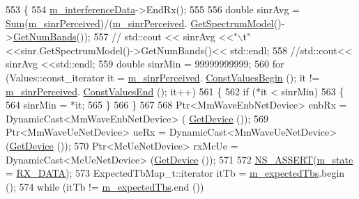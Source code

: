\begin{DoxyCode}
553 \{
554         \hyperlink{classns3_1_1MmWaveSpectrumPhy_a6fa712af38b75eaf093ca7feaaaa70fe}{m\_interferenceData}->EndRx();
555 
556         \textcolor{keywordtype}{double} sinrAvg = \hyperlink{namespacens3_afad5475661952172fe6ef1260360dad8}{Sum}(\hyperlink{classns3_1_1MmWaveSpectrumPhy_a61da15a483343ea141a555b3712db8d7}{m\_sinrPerceived})/(\hyperlink{classns3_1_1MmWaveSpectrumPhy_a61da15a483343ea141a555b3712db8d7}{m\_sinrPerceived}.
      \hyperlink{classns3_1_1SpectrumValue_ade13d535ac74958581d5ad059380dc2a}{GetSpectrumModel}()->\hyperlink{classns3_1_1SpectrumModel_a07c4a1c2f963885dd7fef7f82b20e90b}{GetNumBands}());
557 \textcolor{comment}{//      std::cout << sinrAvg <<"\(\backslash\)t" <<sinr.GetSpectrumModel()->GetNumBands()<< std::endl;}
558         \textcolor{comment}{//std::cout<< sinrAvg <<std::endl;}
559         \textcolor{keywordtype}{double} sinrMin = 99999999999;
560         \textcolor{keywordflow}{for} (Values::const\_iterator it = \hyperlink{classns3_1_1MmWaveSpectrumPhy_a61da15a483343ea141a555b3712db8d7}{m\_sinrPerceived}.
      \hyperlink{classns3_1_1SpectrumValue_aad6900431bd0554b3ba9a00691c2393b}{ConstValuesBegin} (); it != \hyperlink{classns3_1_1MmWaveSpectrumPhy_a61da15a483343ea141a555b3712db8d7}{m\_sinrPerceived}.
      \hyperlink{classns3_1_1SpectrumValue_ab5c2fbde4e06be7c0e4d7a0755c607be}{ConstValuesEnd} (); it++)
561         \{
562                 \textcolor{keywordflow}{if} (*it < sinrMin)
563                 \{
564                         sinrMin = *it;
565                 \}
566         \}
567 
568         Ptr<MmWaveEnbNetDevice> enbRx = DynamicCast<MmWaveEnbNetDevice> (
      \hyperlink{classns3_1_1MmWaveSpectrumPhy_a32b0f96d89e721d518242dcd754a3416}{GetDevice} ());
569         Ptr<MmWaveUeNetDevice> ueRx = DynamicCast<MmWaveUeNetDevice> (\hyperlink{classns3_1_1MmWaveSpectrumPhy_a32b0f96d89e721d518242dcd754a3416}{GetDevice} ());
570         Ptr<McUeNetDevice> rxMcUe = DynamicCast<McUeNetDevice> (\hyperlink{classns3_1_1MmWaveSpectrumPhy_a32b0f96d89e721d518242dcd754a3416}{GetDevice} ());
571 
572         \hyperlink{assert_8h_a6dccdb0de9b252f60088ce281c49d052}{NS\_ASSERT}(\hyperlink{classns3_1_1MmWaveSpectrumPhy_ab6330aa9de7700e7e15b82000335665d}{m\_state} = \hyperlink{classns3_1_1MmWaveSpectrumPhy_a665335f60416cf031a9b68209e4368aea5283250c41727eee6b26940406b690d9}{RX\_DATA});
573         ExpectedTbMap\_t::iterator itTb = \hyperlink{classns3_1_1MmWaveSpectrumPhy_a596e02208ad8258c0bbc41bb26df7d6c}{m\_expectedTbs}.begin ();
574         \textcolor{keywordflow}{while} (itTb != \hyperlink{classns3_1_1MmWaveSpectrumPhy_a596e02208ad8258c0bbc41bb26df7d6c}{m\_expectedTbs}.end ())

\end{DoxyCode}

